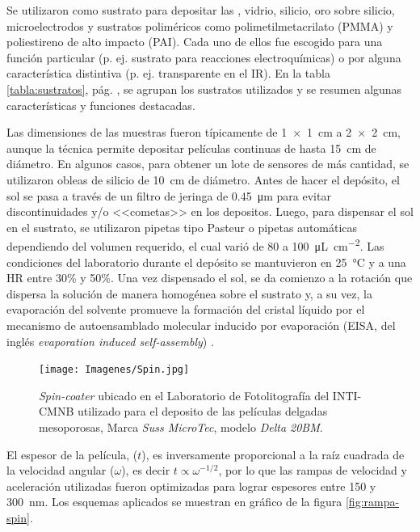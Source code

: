 			Se utilizaron como sustrato para depositar las \pdm, vidrio, silicio, oro sobre silicio, microelectrodos y sustratos poliméricos como  polimetilmetacrilato (PMMA) y poliestireno de alto impacto (PAI). Cada uno de ellos fue escogido para una función particular (p. ej. sustrato para reacciones electroquímicas) o por alguna característica distintiva (p. ej. transparente en el IR). En la tabla \ref{tabla:sustratos}, pág. \pageref{tabla:sustratos}, se agrupan los sustratos utilizados y se resumen algunas características y funciones destacadas.

			Las dimensiones de las muestras fueron típicamente de \SI{1x1}{\cm} a \linebreak \SI{2x2}{\cm}, aunque la técnica permite depositar películas continuas de hasta \SI{15}{cm} de diámetro. En algunos casos, para obtener un lote de sensores de más cantidad, se utilizaron obleas de silicio de \SI{10}{\cm} de diámetro. Antes de hacer el depósito, el sol se pasa a través de un filtro de jeringa de \SI{0.45}{\um} para evitar discontinuidades y/o <<cometas>> en los depositos\cite{Franssila2004}. Luego, para dispensar el sol en el sustrato, se utilizaron pipetas tipo Pasteur o pipetas automáticas dependiendo del volumen requerido, el cual varió de 80 a \SI{100}{\uL.\cm^{-2}}. Las condiciones del laboratorio durante el depósito se mantuvieron en \SI{25}{\celsius} y a una HR entre 30\% y 50\%. Una vez dispensado el sol, se da comienzo a la rotación que dispersa la solución de manera homogénea sobre el sustrato y, a su vez, la evaporación del solvente promueve la formación del cristal líquido por el mecanismo de autoensamblado molecular inducido por evaporación (EISA, del inglés \textit{evaporation induced self-assembly}) \cite{Brinker1999}.

					\begin{figure}[ht!]
					  \begin{center}
					  \texttt{[image: Imagenes/Spin.jpg]}
					  \caption[Equipo para el depósito de películas delgadas, \textit{spin-coater}]{\textit{Spin-coater} ubicado en el Laboratorio de Fotolitografía del INTI-CMNB utilizado para el deposito de las películas delgadas mesoporosas, Marca \textit{Suss MicroTec}, modelo \textit{Delta 20BM}.}
					  \label{fig:spin}
					  \end{center}
					  \end{figure}

			El espesor de la película, ($t$), es inversamente proporcional a la raíz cuadrada de la velocidad angular ($\omega$), es decir $t\propto \omega ^{-1/2}$, por lo que las rampas de velocidad y aceleración utilizadas fueron optimizadas para lograr espesores entre 150 y \SI{300}{\nm}\cite{Meyerhofer1978,Hall1998,Brinker1990}. Los esquemas aplicados se muestran en gráfico de la figura \ref{fig:rampa-spin}. 
				
